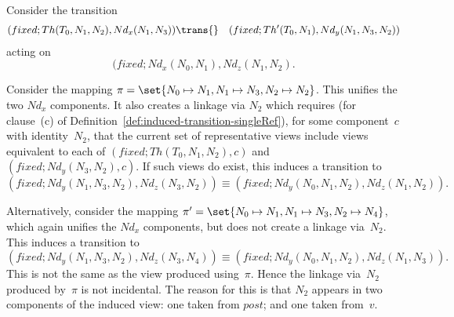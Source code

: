 \begin{example}
Consider the transition
\begin{eqnarray*}
(fixed; Th(T_0,N_1,N_2), Nd_x(N_1,N_3)) & \trans{} &
  (fixed; Th'(T_0,N_1), Nd_y(N_1,N_3,N_2))
\end{eqnarray*}
acting on
\[
(fixed; Nd_x(N_0,N_1), Nd_z(N_1,N_2) .
\]

Consider the mapping $\pi = \set{N_0 \mapsto N_1, N_1 \mapsto N_3, N_2 \mapsto
  N_2}$.  This unifies the two $Nd_x$ components.  It also creates a linkage
via $N_2$ which requires (for clause~(c) of
Definition~\ref{def:induced-transition-singleRef}), for some component~$c$
with identity~$N_2$, that the current set of representative views include
views equivalent to each of $(fixed; Th(T_0,N_1,N_2), c)$ and $(fixed;
Nd_y(N_3,N_2), c)$.  If such views do exist, this induces a transition to
\[
(fixed; Nd_y(N_1,N_3,N_2), Nd_z(N_3,N_2)) \equiv 
  (fixed; Nd_y(N_0,N_1,N_2), Nd_z(N_1,N_2)).
\]

Alternatively, consider the mapping $\pi' = \set{N_0 \mapsto N_1, N_1 \mapsto
  N_3,\linebreak[1] {N_2 \mapsto N_4}}$, which again unifies the $Nd_x$
components, but does not create a linkage via~$N_2$.  This induces a
transition to
\[
(fixed; Nd_y(N_1,N_3,N_2), Nd_z(N_3,N_4)) \equiv
  (fixed; Nd_y(N_0,N_1,N_2), Nd_z(N_1,N_3)).
\]
This is not the same as the view produced using~$\pi$.  Hence the linkage
via~$N_2$ produced by~$\pi$ is not incidental.  The reason for this is that
$N_2$ appears in two components of the induced view: one taken from $post$;
and one taken from~$v$.
\end{example}






